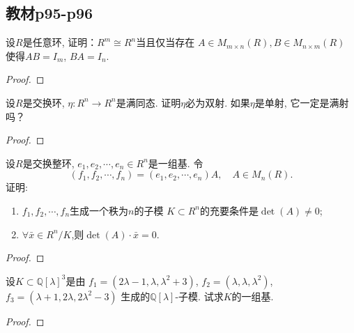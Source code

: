 \subsection{教材p95-p96}

\begin{problem}
    设$R$是任意环, 证明：$R^m \cong R^n$当且仅当存在
$A \in M_{m \times n}(R), B \in M_{n \times m}(R)$
使得$AB = I_m$, $BA = I_{n}$.
\end{problem}

\begin{proof}
    
\end{proof}

\begin{problem}
    设$R$是交换环, $\eta:R^n \to R^n$是满同态.
证明$\eta$必为双射. 如果$\eta$是单射, 它一定是满射吗？
\end{problem}

\begin{proof}
    
\end{proof}

\begin{problem}
    设$R$是交换整环, $e_1, e_2, \cdots, e_n \in R^n$是一组基.
令
\[
    (f_1, f_2, \cdots, f_n) = (e_1, e_2, \cdots, e_n)A,\quad A \in M_n(R).
\]
证明:
\begin{enumerate}[(1)]
    \item $f_1, f_2, \cdots, f_n$生成一个秩为$n$的子模
$K \subset R^n$的充要条件是$\det(A) \neq 0$;
    \item $\forall \bar{x} \in R^{n}/K$,则$\det(A) \cdot \bar{x} = 0$.
\end{enumerate}
\end{problem}

\begin{proof}
    
\end{proof}

\begin{problem}
    设$K \subset \mathbb{Q}[\lambda]^3$是由
$f_1 = (2\lambda - 1, \lambda, \lambda^2 + 3)$,
$f_2 = (\lambda, \lambda, \lambda^2)$,
$f_3 = (\lambda + 1, 2\lambda, 2\lambda^2 - 3)$
生成的$\mathbb{Q}[\lambda]$-子模. 试求$K$的一组基.
\end{problem}

\begin{proof}
    
\end{proof}

